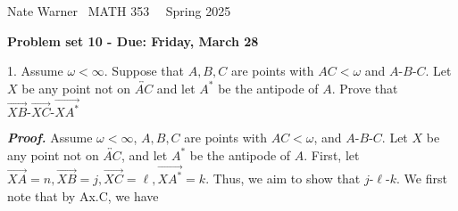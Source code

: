\documentclass{report}
\title{\Huge{}}
\author{\huge{Nathan Warner}}
\date{\huge{}}
\begin{document}
    \pagebreak \bigbreak \noindent
    Nate Warner \ \quad \quad \quad \quad \quad \quad \quad \quad \quad \quad \quad \quad  MATH 353 \quad  \quad \quad \quad \quad \quad \quad \quad \quad \ \ \quad \quad Spring 2025
    \begin{center}
        \textbf{Problem set 10 - Due: Friday, March 28}
    \end{center}
    \bigbreak \noindent 
    \begin{mdframed}
        1. Assume $\omega < \infty$. Suppose that $A,B,C$ are points with $AC < \omega $ and $ A\text{-}B\text{-}C$. Let $X$ be any point not on $\overleftrightarrow{AC}$ and let $A^{*}$ be the antipode of $A$. Prove that $ \overrightarrow{XB}\text{-}\overrightarrow{XC}\text{-}\overrightarrow{XA^{*}} $ 
    \end{mdframed}
    \bigbreak \noindent 
    \textbf{\textit{Proof.}} Assume $\omega < \infty$, $A,B,C$ are points with $AC < \omega$, and $ A\text{-}B\text{-}C$. Let $X$ be any point not on $\overleftrightarrow{AC}$, and let $A^{*}$ be the antipode of $A$.
    \bigbreak \noindent 
    First, let $\overrightarrow{XA} = n, \overrightarrow{XB} = j, \overrightarrow{XC} = \ell, \overrightarrow{XA^{*}} = k$. Thus, we aim to show that $ j\text{-}\ell\text{-}k$. We first note that by Ax.C, we have
\end{document}
